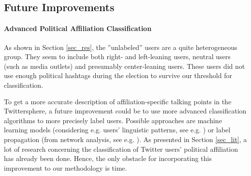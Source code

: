  \subsection{Future Improvements}
    \label{sec_disc_improv}
    
        \paragraph{Advanced Political Affiliation Classification} As shown in Section \ref{sec_res}, the ''unlabeled'' users are a quite heterogeneous group. They seem to include both right- and left-leaning users, neutral users (such as media outlets) and presumably center-leaning users. These users did not use enough political hashtags during the election to survive our threshold for classification.
        
        To get a more accurate description of affiliation-specific talking points in the Twittersphere, a future improvement could be to use more advanced classification algorithms to more precisely label users. Possible approaches are machine learning models (considering e.g. users' linguistic patterns, see e.g. \cite{conover_predicting_2011}) or label propagation (from network analysis, see e.g. \cite{raghavan2007near}). As presented in Section \ref{sec_lit}, a lot of research concerning the classification of Twitter users' political affiliation has already been done. Hence, the only obstacle for incorporating this improvement to our methodology is time. 
        
            
